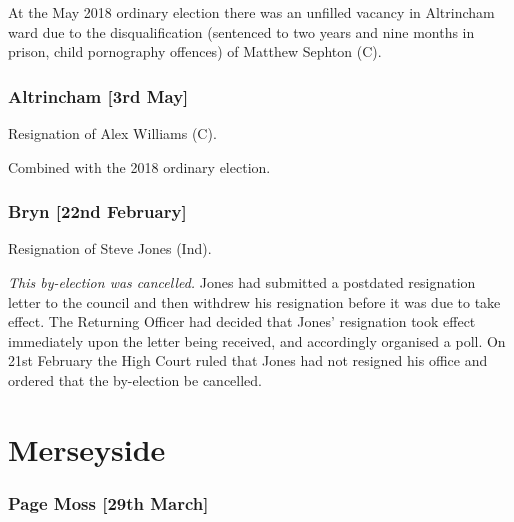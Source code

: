 \begin{resultsiii}

At the May 2018 ordinary election there was an unfilled vacancy in Altrincham ward due to the disqualification (sentenced to two years and nine months in prison, child pornography offences) of Matthew Sephton (C).

\subsubsection*{Altrincham \hspace*{\fill}\nolinebreak[1]%
\enspace\hspace*{\fill}
[3rd May]}


Resignation of Alex Williams (C).

Combined with the 2018 ordinary election.


\subsubsection*{Bryn \hspace*{\fill}\nolinebreak[1]%
\enspace\hspace*{\fill}
[22nd February]}


Resignation of Steve Jones (Ind).

\emph{This by-election was cancelled.}  Jones had submitted a postdated resignation letter to the council and then withdrew his resignation before it was due to take effect.  The Returning Officer had decided that Jones' resignation took effect immediately upon the letter being received, and accordingly organised a poll.  On 21st February the High Court ruled that Jones had not resigned his office and ordered that the by-election be cancelled.

\section{Merseyside}


\subsubsection*{Page Moss \hspace*{\fill}\nolinebreak[1]%
\enspace\hspace*{\fill}
[29th March]}


\end{resultsiii}
